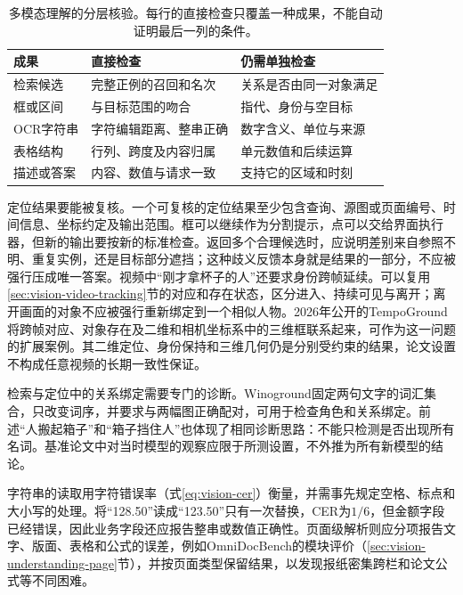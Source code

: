\begin{table}[htbp]
  \centering
  \small
  \begin{tabularx}{\linewidth}{@{}p{19mm}XX@{}}
    \toprule
    成果 & 直接检查 & 仍需单独检查\\
    \midrule
    检索候选 & 完整正例的召回和名次 & 关系是否由同一对象满足\\
    框或区间 & 与目标范围的吻合 & 指代、身份与空目标\\
    OCR字符串 & 字符编辑距离、整串正确 & 数字含义、单位与来源\\
    表格结构 & 行列、跨度及内容归属 & 单元数值和后续运算\\
    描述或答案 & 内容、数值与请求一致 & 支持它的区域和时刻\\
    \bottomrule
  \end{tabularx}
  \caption{多模态理解的分层核验。每行的直接检查只覆盖一种成果，不能自动证明最后一列的条件。}
  \label{tab:vision-understanding-evaluation}
\end{table}
\FloatBarrier

定位结果要能被复核。一个可复核的定位结果至少包含查询、源图或页面编号、时间信息、坐标约定及输出范围。框可以继续作为分割提示，点可以交给界面执行器，但新的输出要按新的标准检查。返回多个合理候选时，应说明差别来自参照不明、重复实例，还是目标部分遮挡；这种歧义反馈本身就是结果的一部分，不应被强行压成唯一答案。视频中“刚才拿杯子的人”还要求身份跨帧延续。可以复用\ref{sec:vision-video-tracking}节的对应和存在状态，区分进入、持续可见与离开；离开画面的对象不应被强行重新绑定到一个相似人物。2026年公开的TempoGround将跨帧对应、对象存在及二维和相机坐标系中的三维框联系起来，可作为这一问题的扩展案例。其二维定位、身份保持和三维几何仍是分别受约束的结果，论文设置不构成任意视频的长期一致性保证。

检索与定位中的关系绑定需要专门的诊断。Winoground固定两句文字的词汇集合，只改变词序，并要求与两幅图正确配对，可用于检查角色和关系绑定。前述“人搬起箱子”和“箱子挡住人”也体现了相同诊断思路：不能只检测是否出现所有名词。基准论文中对当时模型的观察应限于所测设置，不外推为所有新模型的结论。

字符串的读取用字符错误率（式\eqref{eq:vision-cer}）衡量，并需事先规定空格、标点和大小写的处理。将“128.50”读成“123.50”只有一次替换，CER为$1/6$，但金额字段已经错误，因此业务字段还应报告整串或数值正确性。页面级解析则应分项报告文字、版面、表格和公式的误差，例如OmniDocBench的模块评价（\ref{sec:vision-understanding-page}节），并按页面类型保留结果，以发现报纸密集跨栏和论文公式等不同困难。

